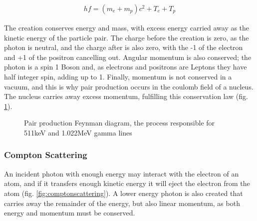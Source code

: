 \begin{equation}
\begin{split}
h f = (m_e + m_p) c^2 + T_e + T_p
\end{split}
\label{eq:pairproduction}
\end{equation}

The creation conserves energy and mass, with excess energy carried away as the kinetic energy of the particle pair.  The charge before the creation is zero, as the photon is neutral, and the charge after is also zero, with the -1 of the electron and +1 of the positron cancelling out.  Angular momentum is also conserved; the photon is a spin 1 Boson and, as electrons and positrons are Leptons they have half integer spin, adding up to 1.  Finally, momentum is not conserved in a vacuum, and this is why pair production occurs in the coulomb field of a nucleus.  The nucleus carries away excess momentum, fulfilling this conservation law (fig. \ref{fig:pairproduction}).

\begin{figure}[h]
\begin{center}
\end{center}
\caption{Pair production Feynman diagram, the process responsible for 511keV and 1.022MeV gamma lines\cite{pairproductionfeynman}}
\label{fig:pairproduction}
\end{figure}


\subsubsection{Compton Scattering}

An incident photon with enough energy may interact with the electron of an atom, and if it transfers enough kinetic energy it will eject the electron from the atom (fig. \ref{fig:comptonscattering}).  A lower energy photon is also created that carries away the remainder of the energy, but also linear momentum, as both energy and momentum must be conserved.

